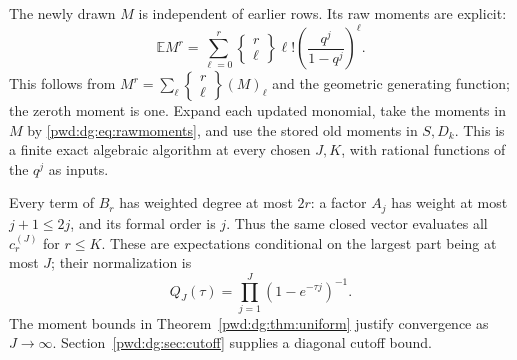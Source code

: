 \documentclass[11pt,letterpaper]{article}
\numberwithin{equation}{section}
\theoremstyle{remark}\newtheorem{remark}[theorem]{Remark}
\newcommand{\E}{\mathbb E}\newcommand{\Prob}{\mathbb P}
\begin{document}
The newly drawn $M$ is independent of earlier rows. Its raw moments are explicit:
\begin{equation}\label{pwd:dg:eq:rawmoments}
 \E M^r=\sum_{\ell=0}^r\left\{\begin{matrix}r\\\ell\end{matrix}\right\}
      \ell!\left(\frac{q^j}{1-q^j}\right)^\ell.
\end{equation}
This follows from $M^r=\sum_\ell\left\{\begin{smallmatrix}r\\\ell\end{smallmatrix}\right\}(M)_\ell$ and the geometric generating function; the zeroth moment is one. Expand each updated monomial, take the moments in $M$ by \eqref{pwd:dg:eq:rawmoments}, and use the stored old moments in $S,D_k$. This is a finite exact algebraic algorithm at every chosen $J,K$, with rational functions of the $q^j$ as inputs.

Every term of $B_r$ has weighted degree at most $2r$: a factor $A_j$ has weight at most $j+1\le2j$, and its formal order is $j$. Thus the same closed vector evaluates all $c_r^{(J)}$ for $r\le K$. These are expectations conditional on the largest part being at most $J$; their normalization is
\begin{equation}\label{pwd:dg:eq:QJ}
 Q_J(\tau)=\prod_{j=1}^J(1-e^{-\tau j})^{-1}.
\end{equation}
The moment bounds in Theorem~\ref{pwd:dg:thm:uniform} justify convergence as $J\to\infty$. Section~\ref{pwd:dg:sec:cutoff} supplies a diagonal cutoff bound.
\end{document}
